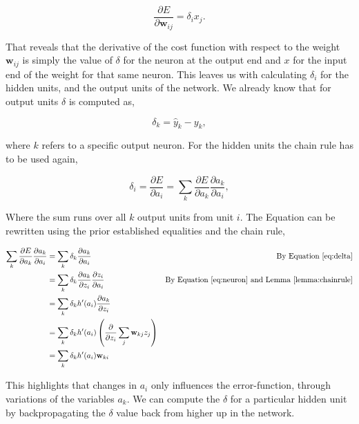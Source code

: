 \begin{equation} \label{eq:deriv}
    \frac{\partial E}{\partial \mathbf{w}_{ij}} = \delta_i x_j.
\end{equation}

That reveals that the derivative of the cost function with respect to the weight
$\mathbf{w}_{ij}$ is simply the value of $\delta$ for the neuron at the output
end and $x$ for the input end of the weight for that same neuron. This leaves us
with calculating $\delta_i$ for the hidden units, and the output units of the
network. We already know that for output units $\delta$ is computed as,

\begin{equation}
    \label{eq:output}
    \delta_k = \hat{y}_k - y_k,
\end{equation}

where $k$ refers to a specific output neuron. For the hidden units the chain
rule has to be used again,

\begin{equation}
    \label{eq:bp}
    \delta_i = \frac{\partial E}{\partial a_i} =
    \sum_k \frac{\partial E}{\partial a_k} \frac{\partial a_k}{\partial a_i},
\end{equation}

Where the sum runs over all $k$ output units from unit $i$. The Equation can be
rewritten using the prior established equalities and the chain rule,


\begin{align}
    \sum_k \frac{\partial E}{\partial a_k} \frac{\partial a_k}{\partial a_i}
    &= \sum_k \delta_k \frac{\partial a_k}{\partial a_i}
    & \text{By Equation \eqref{eq:delta}}
    \\
    &= \sum_k \delta_k \frac{\partial a_k}{\partial z_i}
        \frac{\partial z_i}{\partial a_i}
    & \text{By Equation \eqref{eq:neuron} and Lemma \ref{lemma:chainrule}}
    \\
    &= \sum_k \delta_k h'(a_i) \frac{\partial a_k}{\partial z_i}
    \\
    &= \sum_k \delta_k h'(a_i) \left( \frac{\partial}{\partial z_i}
        \sum_{j} \mathbf{w}_{kj} z_j\right)
    \\
    &= \sum_k \delta_k h'(a_i) \mathbf{w}_{ki}
    \\
\end{align}

This highlights that changes in $a_i$ only influences the error-function,
through variations of the variables $a_k$. We can compute the $\delta$ for a
particular hidden unit by backpropagating the $\delta$ value back from higher up
in the network.

